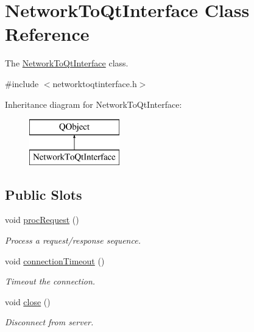 \hypertarget{classNetworkToQtInterface}{\section{Network\-To\-Qt\-Interface Class Reference}
\label{classNetworkToQtInterface}
}


The \hyperlink{classNetworkToQtInterface}{Network\-To\-Qt\-Interface} class.  




{\ttfamily \#include $<$networktoqtinterface.\-h$>$}

Inheritance diagram for Network\-To\-Qt\-Interface\-:\begin{figure}[H]
\begin{center}
\leavevmode
\includegraphics[height=2.000000cm]{classNetworkToQtInterface}
\end{center}
\end{figure}
\subsection*{Public Slots}
\begin{DoxyCompactItemize}
\item 
void \hyperlink{classNetworkToQtInterface_ae998c02ca1c22313b0abc90fc4b7c2a6}{proc\-Request} ()
\begin{DoxyCompactList}\small\item\em Process a request/response sequence. \end{DoxyCompactList}\item 
void \hyperlink{classNetworkToQtInterface_a3413c676b1bb27ddc2df47128cf68c5d}{connection\-Timeout} ()
\begin{DoxyCompactList}\small\item\em Timeout the connection. \end{DoxyCompactList}\item 
void \hyperlink{classNetworkToQtInterface_ac4889eb9f3c5b5e4509252481335200f}{close} ()
\begin{DoxyCompactList}\small\item\em Disconnect from server. \end{DoxyCompactList}\end{DoxyCompactItemize}

